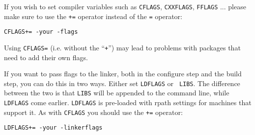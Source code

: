 If you wish  to set compiler variables   such as {\tt CFLAGS},  {\tt CXXFLAGS},
{\tt FFLAGS} ... please make sure to use  the {\tt +=}  operator instead of the
{\tt {=}} operator:

\begin{verbatim}
CFLAGS+= -your -flags
\end{verbatim}

Using {\tt CFLAGS=} (i.e.  without the ``{\tt +}'') may  lead to  problems with
packages that need to add their own flags.

If you want  to pass flags  to the linker, both in  the configure  step and the
build step, you  can do this  in  two ways.   Either set {\tt  LDFLAGS} or {\tt
LIBS}.  The difference between  the two is that  {\tt LIBS} will be appended to
the command line, while {\tt LDFLAGS} come earlier. {\tt LDFLAGS} is pre-loaded
with rpath settings   for machines that support  it.  As with {\tt CFLAGS}  you
should use the {\tt +=} operator:

\begin{verbatim}
LDFLAGS+= -your -linkerflags
\end{verbatim}

